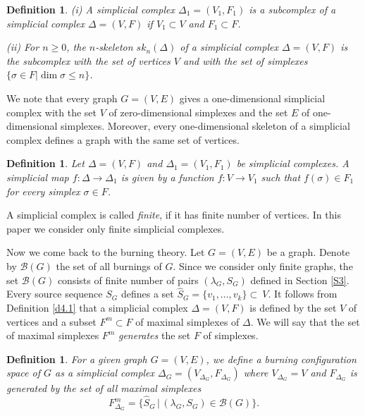 \documentclass[a4paper, 11pt]{article}
\newtheorem{definition}[theorem]{Definition}
\begin{document}
\begin{definition}\label{d4.2}\rm (i) A simplicial complex 
$\Delta_1=(V_1, F_1)$ is a \emph{subcomplex} of a simplicial complex  $\Delta=(V,F)$  if $V_1\subset V$ and $F_1\subset F$. 


(ii) For $n\geq 0$, the \emph{$n$-skeleton}  $sk_n(\Delta)$ of a simplicial complex 
$\Delta=(V,F)$ is the subcomplex with the set of vertices $V$ and with the set of simplexes  $\{\sigma \in F| \operatorname{dim}\sigma \leq n\}$.
\end{definition} 

We note that every graph $G=(V,E)$ gives a   one-dimensional simplicial complex with the set $V$ of zero-dimensional simplexes and the set $E$ of one-dimensional simplexes.  Moreover, every  one-dimensional skeleton of a simplicial complex defines a graph with the same set of  vertices. 

\begin{definition} \label{d4.3} \rm  Let $\Delta=(V,F)$ and  $\Delta_1=(V_1,F_1)$
be simplicial complexes. A \emph{simplicial map}  $f\colon \Delta\to \Delta_1$ is given by a function $f\colon V\to V_1$ such that $f(\sigma)\in F_1$ for every simplex
$\sigma\in F$. 
\end{definition}

A simplicial complex is called \emph{finite}, if it has  finite number of vertices.
In this paper we  consider only finite  simplicial complexes.


\bigskip

Now we come back to the burning theory. Let $G=(V,E)$ be a graph. Denote by   $\mathcal  B(G)$ the set of all burnings of $G$. Since we consider only finite graphs, the set  $\mathcal  B(G)$
consists  of  finite number of pairs $(\lambda_G, S_G)$  defined in Section \ref{S3}. Every source sequence $S_G$ defines a set  $\widehat S_G= \{v_1, \dots, v_k\}\subset ~V$.    It follows from Definition \ref{d4.1} that a simplicial complex 
$\Delta=(V,F)$  is  defined  by the set $V$ of vertices and  a subset $F^m\subset F$ of maximal simplexes of $\Delta$.  We  will say that the set of maximal simplexes $F^m$ 
\emph{generates} the set $F$ of simplexes. 

\begin{definition}\label{d4.4}\rm  For a given graph $G=(V,E)$, we  define a \emph{burning configuration space of $G$} as a  simplicial complex $\Delta_G=(V_{\Delta_G}, F_{\Delta_G})$ where 
$V_{\Delta_G}=V$ and $F_{\Delta_G}$ is generated by the set of all maximal simplexes 
$$
F_{\Delta_G}^m=\{\widehat S_G\, |\, (\lambda_G, S_G)\in \mathcal B(G)\}.
$$  
\end{definition}
\end{document}
